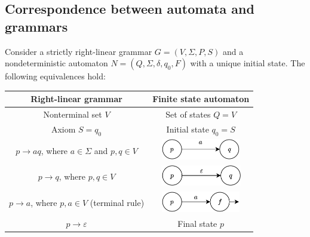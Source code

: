 \subsection{Correspondence between automata and grammars}
Consider a strictly right-linear grammar $G=(V,\Sigma,P,S)$ and a nondeterministic automaton $N=(Q,\Sigma,\delta,q_0,F)$ with a unique initial state.
The following equivalences hold:
\renewcommand*{\arraystretch}{2}
\begin{table}[H]
    \centering
    \begin{tabular}{cc}
    \hline
    \textbf{Right-linear grammar}                            & \textbf{Finite state automaton} \\ \hline
    Nonterminal set $V$                                      & Set of states $Q=V$             \\
    Axiom $S=q_0$                                            & Initial state $q_0=S$           \\
    $p \rightarrow aq$, where $a \in \Sigma$ and $p,q \in V$ & \begin{minipage}{.2\textwidth}\centering\includegraphics[width=\linewidth, height=9mm]{images/a.png}\end{minipage}                                \\
    $p \rightarrow q$, where $p,q \in V$                     & \begin{minipage}{.2\textwidth}\centering\includegraphics[width=\linewidth, height=9mm]{images/b.png}\end{minipage}                                 \\
    $p \rightarrow a$, where $p,a \in V$ (terminal rule)     & \begin{minipage}{.2\textwidth}\centering\includegraphics[width=\linewidth, height=9mm]{images/c.png}\end{minipage}                                 \\
    $p \rightarrow \varepsilon$                              & Final state $p$                 \\ \hline
    \end{tabular}
\end{table}
